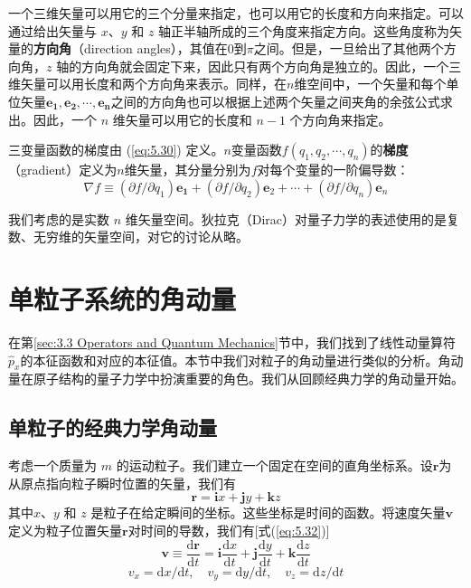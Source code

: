     一个三维矢量可以用它的三个分量来指定，也可以用它的长度和方向来指定。可以通过给出矢量与 $x$、$y$ 和 $z$ 轴正半轴所成的三个角度来指定方向。这些角度称为矢量的\textbf{方向角}（direction angles），其值在$0$到$\pi$之间。但是，一旦给出了其他两个方向角，$z$ 轴的方向角就会固定下来，因此只有两个方向角是独立的。因此，一个三维矢量可以用长度和两个方向角来表示。同样，在$n$维空间中，一个矢量和每个单位矢量$\mathbf{e_1},\mathbf{e_2},\cdots,\mathbf{e_n}$之间的方向角也可以根据上述两个矢量之间夹角的余弦公式求出。因此，一个 $n$ 维矢量可以用它的长度和 $n-1$ 个方向角来指定。

    三变量函数的梯度由 (\ref{eq:5.30}) 定义。$n$变量函数$f\left(q_1,q_2,\cdots,q_n\right)$的\textbf{梯度}（gradient）定义为$n$维矢量，其分量分别为$f$对每个变量的一阶偏导数：
    \begin{equation*}
        \nabla f \equiv \left(\partial f/\partial q_1\right)\mathbf{e_1} + \left(\partial f/\partial q_2\right)\mathbf{e}_2 + \cdots + \left(\partial f/\partial q_n\right)\mathbf{e}_n
    \end{equation*}

    我们考虑的是实数 $n$ 维矢量空间。狄拉克（Dirac）对量子力学的表述使用的是复数、无穷维的矢量空间，对它的讨论从略。

\section{单粒子系统的角动量}
\label{sec:5.3 Angular Momentum of a One-Particle System}
    在第\ref{sec:3.3 Operators and Quantum Mechanics}节中，我们找到了线性动量算符$\hat{p}_x$的本征函数和对应的本征值。本节中我们对粒子的角动量进行类似的分析。角动量在原子结构的量子力学中扮演重要的角色。我们从回顾经典力学的角动量开始。

    \subsection*{单粒子的经典力学角动量}
    考虑一个质量为 $m$ 的运动粒子。我们建立一个固定在空间的直角坐标系。设$\mathbf{r}$为从原点指向粒子瞬时位置的矢量，我们有
    \begin{equation}
        \mathbf{r} = \mathbf{i}x + \mathbf{j}y + \mathbf{k}z
        \label{eq:5.33}
    \end{equation}
    其中$x$、$y$ 和 $z$ 是粒子在给定瞬间的坐标。这些坐标是时间的函数。将速度矢量$\mathbf{v}$定义为粒子位置矢量$\mathbf{r}$对时间的导数，我们有[式(\ref{eq:5.32})]
    \begin{equation}
        \mathbf{v} \equiv \frac{\mathrm{d}\mathbf{r}}{\mathrm{d}t} = \mathbf{i}\frac{\mathrm{d}x}{\mathrm{d}t} + \mathbf{j}\frac{\mathrm{d}y}{\mathrm{d}t} + \mathbf{k}\frac{\mathrm{d}z}{\mathrm{d}t}
        \label{eq:5.34}
    \end{equation}
    \begin{equation*}
        v_x = \mathrm{d}x/\mathrm{d}t, \quad v_y = \mathrm{d}y/\mathrm{d}t, \quad v_z = \mathrm{d}z/\mathrm{d}t
    \end{equation*}

